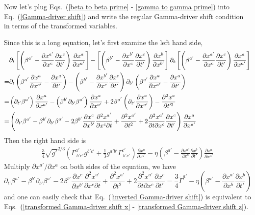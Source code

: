 Now let's plug Eqs.~(\ref{beta to beta prime} - \ref{gamma to gamma prime}) into Eq.~(\ref{Gamma-driver shift}) and write the regular Gamma-driver shift condition in terms of the transformed variables. 

Since this is a long equation, let's first examine the left hand side, 
\begin{align}
& \partial_{t}\left[\left(\beta^{a'} - \frac{\partial x^{a'}}{\partial x^{c}}\frac{\partial x^{c}}{\partial t'}\right)\frac{\partial x^{a}}{\partial x^{a'}}\right] - \left[\left(\beta^{b'} - \frac{\partial x^{b'}}{\partial x^{c}}\frac{\partial x^{c}}{\partial t'}\right)\frac{\partial x^{b}}{\partial x^{b'}}\right]\partial_{b}\left[\left(\beta^{a'} - \frac{\partial x^{a'}}{\partial x^{c}}\frac{\partial x^{c}}{\partial t'}\right)\frac{\partial x^{a}}{\partial x^{a'}}\right]\notag\\
= & \partial_{t}\left(\beta^{a'}\frac{\partial x^{a}}{\partial x^{a'}} - \frac{\partial x^{a}}{\partial t'}\right) - \left(\beta^{b'} - \frac{\partial x^{b'}}{\partial x^{c}}\frac{\partial x^{c}}{\partial t'}\right)\partial_{b'}\left(\beta^{a'}\frac{\partial x^{a}}{\partial x^{a'}} - \frac{\partial x^{a}}{\partial t'}\right)\notag\\
= & \left(\partial_{t'}\beta^{a'}\right)\frac{\partial x^{a}}{\partial x^{a'}} - \left(\beta^{b'}\partial_{b'}\beta^{a'}\right)\frac{\partial x^{a}}{\partial x^{a'}} + 2\beta^{a'}\left(\partial_{t'}\frac{\partial x^{a}}{\partial x^{a'}}\right) - \frac{\partial^{2}x^{a}}{\partial t'^{2}}\notag\\
= & \left(\partial_{t'}\beta^{a'} - \beta^{b'}\partial_{b'}\beta^{a'} - 2\beta^{b'}\frac{\partial x^{c}}{\partial x^{b'}}\frac{\partial^{2}x^{a'}}{\partial x^{c}\partial t} + \frac{\partial^{2} x^{a'}}{\partial t^{2}} + 2\frac{\partial^{2} x^{a'}}{\partial t\partial x^{c}}\frac{\partial x^{c}}{\partial t'}\right)\frac{\partial x^{a}}{\partial x^{a'}}
\end{align}
Then the right hand side is
\begin{align}
\frac{3}{4}\sqrt{g'}^{2/3}\left(\Gamma^{a'}_{~b'c'}g^{b'c'} + \frac{1}{3}g^{a'b'}\Gamma^{c'}_{~b'c'}\right)\frac{\partial x^{a}}{\partial x^{a'}} - \eta\left(\beta^{a'} - \frac{\partial x^{a'}}{\partial x^{b}}\frac{\partial x^{b}}{\partial t'}\right)\frac{\partial x^{a}}{\partial x^{a'}}
\end{align}
Multiply $\partial x^{a'}/\partial x^{a}$ on both sides of the equation, we have
\begin{equation}
\partial_{t'}\beta^{a'} - \beta^{b'}\partial_{b'}\beta^{a'} - 2\beta^{b'}\frac{\partial x^{c}}{\partial x^{b'}}\frac{\partial^{2}x^{a'}}{\partial x^{c}\partial t} + \frac{\partial^{2} x^{a'}}{\partial t^{2}} +  2\frac{\partial^{2} x^{a'}}{\partial t\partial x^{c}}\frac{\partial x^{c}}{\partial t'} = \frac{3}{4}{\tilde \Gamma}^{a'} - \eta\left(\beta^{a'} - \frac{\partial x^{a'}}{\partial x^{b}}\frac{\partial x^{b}}{\partial t'}\right)\label{inverted Gamma-driver shift}
\end{equation}
and one can easily check that Eq.~(\ref{inverted Gamma-driver shift}) is equivalent to Eqs.~(\ref{transformed Gamma-driver shift x} - \ref{transformed Gamma-driver shift z}).

